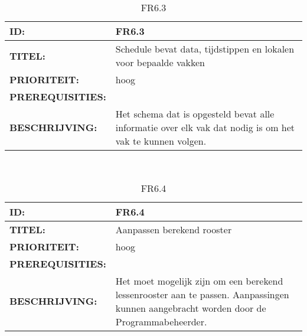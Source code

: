 \noindent\begin{table}[h]
            \begin{tabular}{l | p{10cm}}
                \textbf{ID:} & FR6.3 \\ \hline
                \textbf{TITEL:} & Schedule bevat data, tijdstippen en lokalen voor bepaalde vakken\\ \hline
                \textbf{PRIORITEIT:} &  hoog \\ \hline
                \textbf{PREREQUISITIES:} & \\ \hline
                \textbf{BESCHRIJVING:} & Het schema dat is opgesteld bevat alle informatie over elk vak dat nodig is om het vak te kunnen volgen.\\
            \end{tabular}\\
            \caption{FR6.3}
            \label{tab:FR6.3}
        \end{table}
        
\noindent\begin{table}[h]
            \begin{tabular}{l | p{10cm}}
                \textbf{ID:} & FR6.4 \\ \hline
                \textbf{TITEL:} & Aanpassen berekend rooster \\ \hline
                \textbf{PRIORITEIT:} &  hoog \\ \hline
                \textbf{PREREQUISITIES:} & \\ \hline
                \textbf{BESCHRIJVING:} & Het moet mogelijk zijn om een berekend lessenrooster aan te passen. Aanpassingen kunnen aangebracht worden door de Programmabeheerder.\\
            \end{tabular}\\
            \caption{FR6.4}
            \label{tab:FR6.4}
        \end{table}
        

